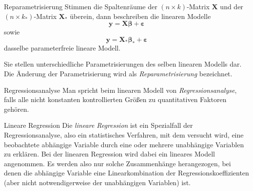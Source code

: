 \begin{bonus}{Reparametrisierung}
    Stimmen die Spaltenräume der $(n \times k)$-Matrix $\mathbf{X}$ und der $(n \times k_*)$-Matrix $\mathbf{X_*}$ überein, dann beschreiben die linearen Modelle
    \[
        \mathbf{y} = \mathbf{X} \boldsymbol{\beta} + \boldsymbol{\varepsilon}
    \]
    sowie
    \[
        \mathbf{y} = \mathbf{X_*} \boldsymbol{\beta_*} + \boldsymbol{\varepsilon}
    \]
    dasselbe parameterfreie lineare Modell.

    Sie stellen unterschiedliche Parametrisierungen des selben linearen Modells dar.
    Die Änderung der Parametrisierung wird als \emph{Reparametrisierung} bezeichnet.
\end{bonus}

\begin{defi}{Regressionsanalyse}
    Man spricht beim linearen Modell von \emph{Regressionsanalyse}, falls alle nicht konstanten kontrollierten Größen zu quantitativen Faktoren gehören.
\end{defi}

\begin{defi}[Regressionsanalyse]{Lineare Regression}
    Die \emph{lineare Regression} ist ein Spezialfall der Regressionsanalyse, also ein statistisches Verfahren, mit dem versucht wird, eine beobachtete abhängige Variable durch eine oder mehrere unabhängige Variablen zu erklären.
    Bei der linearen Regression wird dabei ein lineares Modell angenommen.
    Es werden also nur solche Zusammenhänge herangezogen, bei denen die abhängige Variable eine Linearkombination der Regressionskoeffizienten (aber nicht notwendigerweise der unabhängigen Variablen) ist.
\end{defi}

